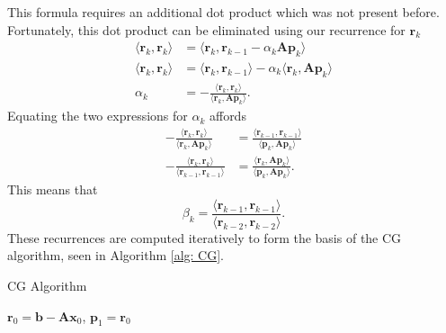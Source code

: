 This formula requires an additional dot product which was not present before. Fortunately, this dot product can be eliminated using our recurrence for $\bm{r}_k$
\begin{align*}
    \langle \bm{r}_k , \bm{r}_k \rangle & = \langle \bm{r}_k , \bm{r}_{k-1} - \alpha_k \bm{A} \bm{p}_k \rangle                            \\
    \langle \bm{r}_k , \bm{r}_k \rangle & = \langle \bm{r}_k , \bm{r}_{k-1} \rangle - \alpha_k \langle \bm{r}_k , \bm{A} \bm{p}_k \rangle \\
    \alpha_k                            & = - \frac{\langle \bm{r}_k , \bm{r}_k \rangle}{\langle \bm{r}_k , \bm{A} \bm{p}_k \rangle}.
\end{align*}
Equating the two expressions for $\alpha_k$ affords
\begin{align*}
    - \frac{\langle \bm{r}_k , \bm{r}_k \rangle}{\langle \bm{r}_k , \bm{A} \bm{p}_k \rangle}  & = \frac{\langle \bm{r}_{k-1} , \bm{r}_{k-1} \rangle}{\langle \bm{p}_k, \bm{A} \bm{p}_k \rangle} \\
    - \frac{\langle \bm{r}_k , \bm{r}_k \rangle}{\langle \bm{r}_{k-1} , \bm{r}_{k-1} \rangle} & = \frac{\langle \bm{r}_k , \bm{A} \bm{p}_k \rangle}{\langle \bm{p}_k, \bm{A} \bm{p}_k \rangle}.
\end{align*}
This means that
\[
    \beta_k = \frac{\langle \bm{r}_{k-1} , \bm{r}_{k-1} \rangle}{\langle \bm{r}_{k-2} , \bm{r}_{k-2} \rangle}.
\]
These recurrences are computed iteratively to form the basis of the CG algorithm, seen in Algorithm \ref{alg: CG}.

{\centering
\begin{minipage}{.85\linewidth}
    \begin{algorithm}[H]
        \caption{CG Algorithm}
        \label{alg: CG}
        \SetAlgoLined
        \DontPrintSemicolon

        \BlankLine
        $\bm{r}_0 = \bm{b} - \bm{A} \bm{x}_0$, $\bm{p}_1 = \bm{r}_0$\;
        \BlankLine
    \end{algorithm}
\end{minipage}
\par
}

